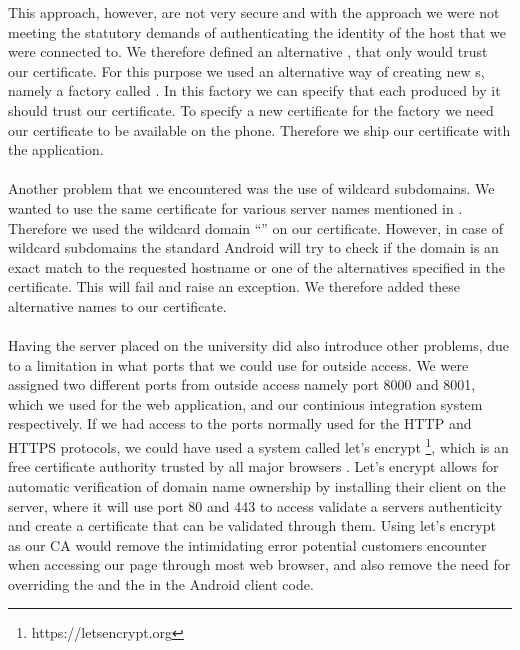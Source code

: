 This approach, however, are not very secure and with the approach we were not meeting the statutory demands of authenticating the identity of the host that we were connected to. We therefore defined an alternative , that only would trust our certificate. For this purpose we used an alternative way of creating new s, namely a factory called . In this factory we can specify that each  produced by it should trust our certificate. To specify a new certificate for the factory we need our certificate to be available on the phone. Therefore we ship our certificate with the application. 
\\\\
Another problem that we encountered was the use of wildcard subdomains. We wanted to use the same certificate for various server names mentioned in . Therefore we used the wildcard domain ``'' on our certificate. However, in case of wildcard subdomains the standard Android  will try to check if the domain is an exact match to the requested hostname or one of the alternatives specified in the certificate. This will fail and raise an exception. We therefore added these alternative names to our certificate.
\\\\
Having the server placed on the university did also introduce other problems, due to a limitation in what ports that we could use for outside access. We were assigned two different ports from outside access namely port 8000 and 8001, which we used for the web application, and our continious integration system respectively. If we had access to the ports normally used for the HTTP and HTTPS protocols, we could have used a system called let's encrypt \footnote{https://letsencrypt.org}, which is an free certificate authority trusted by all major browsers \parencite{lets_encrypt_all_browsers}. Let's encrypt allows for automatic verification of domain name ownership by installing their client on the server, where it will use port 80 and 443 to access validate a servers authenticity and create a certificate that can be validated through them. Using let's encrypt as our CA would remove the intimidating error potential customers encounter when accessing our page through most web browser, and also remove the need for overriding the  and the  in the Android client code.